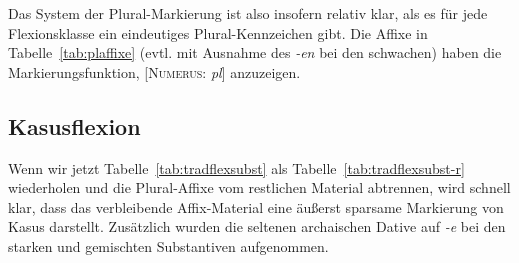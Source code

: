 
Das System der Plural-Markierung ist also insofern relativ klar, als es für jede Flexionsklasse ein eindeutiges Plural-Kennzeichen gibt.
Die Affixe in Tabelle~\ref{tab:plaffixe} (evtl. mit Ausnahme des \textit{-en} bei den schwachen) haben die Markierungsfunktion, [\textsc{Numerus}: \textit{pl}] anzuzeigen.

\subsection{Kasusflexion}

\label{sec:kasusmark}

Wenn wir jetzt Tabelle~\ref{tab:tradflexsubst} als Tabelle~\ref{tab:tradflexsubst-r} wiederholen und die Plural-Affixe vom restlichen Material abtrennen, wird schnell klar, dass das verbleibende Affix-Material eine äußerst sparsame Markierung von Kasus darstellt.
Zusätzlich wurden die seltenen archaischen Dative auf \textit{-e} bei den starken und gemischten Substantiven aufgenommen.

